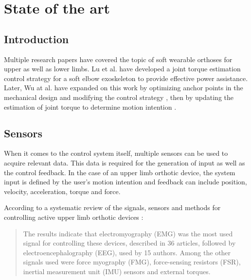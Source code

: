 \chapter{State of the art}

\section{Introduction}
Multiple research papers have covered the topic of soft wearable orthoses for 
upper as well as lower limbs. Lu et al. \cite{lu_development_2019} have developed 
a joint torque estimation control strategy for a soft elbow exoskeleton to 
provide effective power assistance. Later, Wu at al. 
have expanded on this work by optimizing anchor points in the mechanical design and 
modifying the control strategy \cite{wu_neural-network-enhanced_2019}, then by updating 
the estimation of joint torque to determine motion intention \cite{wu_adaptive_2023}.


\section{Sensors}
When it comes to the control system itself, multiple sensors can be used to acquire 
relevant data. This data is required for the generation of input as well as the 
control feedback. In the case of an upper limb orthotic device, the system input 
is defined by the user's motion intention and feedback can include position, velocity, 
acceleration, torque and force.

According to a systematic review of the signals, sensors and methods for controlling 
active upper limb orthotic devices \cite{dos_santos_signals_2023}:
\begin{quotation}
The results indicate that electromyography (EMG) was the most used signal for 
controlling these devices, described in 36 articles, followed by 
electroencephalography (EEG), used by 15 authors. Among the other signals used 
were force myography (FMG), force-sensing resistors (FSR), inertial measurement 
unit (IMU) sensors and external torques.
\end{quotation}

